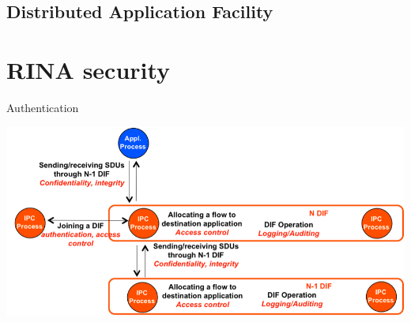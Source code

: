 \documentclass[aspectratio=169]{beamer}
\begin{document}
\subsection{Distributed Application Facility}


\section{RINA security}

\begin{subsection}{Authentication}
    \begin{frame}
        \centering
        \includegraphics[scale=0.9]{img/rina-sec.png}
    \end{frame}
\end{subsection}
\end{document}
